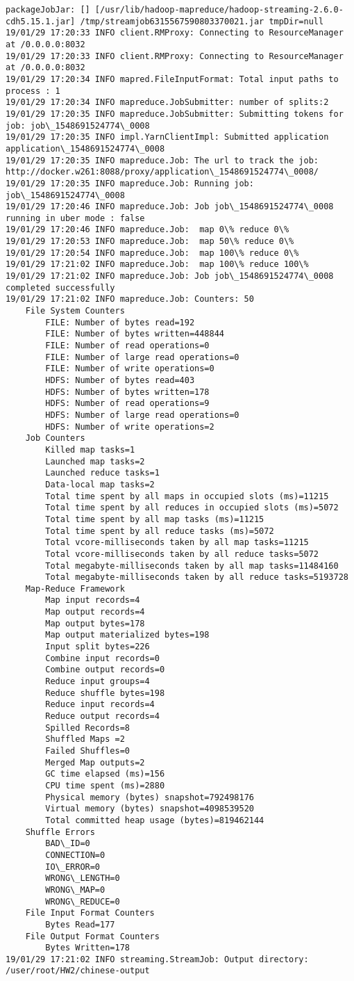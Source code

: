 \documentclass[11pt]{article}
\begin{document}
    \begin{Verbatim}[commandchars=\\\{\}]
packageJobJar: [] [/usr/lib/hadoop-mapreduce/hadoop-streaming-2.6.0-cdh5.15.1.jar] /tmp/streamjob6315567590803370021.jar tmpDir=null
19/01/29 17:20:33 INFO client.RMProxy: Connecting to ResourceManager at /0.0.0.0:8032
19/01/29 17:20:33 INFO client.RMProxy: Connecting to ResourceManager at /0.0.0.0:8032
19/01/29 17:20:34 INFO mapred.FileInputFormat: Total input paths to process : 1
19/01/29 17:20:34 INFO mapreduce.JobSubmitter: number of splits:2
19/01/29 17:20:35 INFO mapreduce.JobSubmitter: Submitting tokens for job: job\_1548691524774\_0008
19/01/29 17:20:35 INFO impl.YarnClientImpl: Submitted application application\_1548691524774\_0008
19/01/29 17:20:35 INFO mapreduce.Job: The url to track the job: http://docker.w261:8088/proxy/application\_1548691524774\_0008/
19/01/29 17:20:35 INFO mapreduce.Job: Running job: job\_1548691524774\_0008
19/01/29 17:20:46 INFO mapreduce.Job: Job job\_1548691524774\_0008 running in uber mode : false
19/01/29 17:20:46 INFO mapreduce.Job:  map 0\% reduce 0\%
19/01/29 17:20:53 INFO mapreduce.Job:  map 50\% reduce 0\%
19/01/29 17:20:54 INFO mapreduce.Job:  map 100\% reduce 0\%
19/01/29 17:21:02 INFO mapreduce.Job:  map 100\% reduce 100\%
19/01/29 17:21:02 INFO mapreduce.Job: Job job\_1548691524774\_0008 completed successfully
19/01/29 17:21:02 INFO mapreduce.Job: Counters: 50
	File System Counters
		FILE: Number of bytes read=192
		FILE: Number of bytes written=448844
		FILE: Number of read operations=0
		FILE: Number of large read operations=0
		FILE: Number of write operations=0
		HDFS: Number of bytes read=403
		HDFS: Number of bytes written=178
		HDFS: Number of read operations=9
		HDFS: Number of large read operations=0
		HDFS: Number of write operations=2
	Job Counters 
		Killed map tasks=1
		Launched map tasks=2
		Launched reduce tasks=1
		Data-local map tasks=2
		Total time spent by all maps in occupied slots (ms)=11215
		Total time spent by all reduces in occupied slots (ms)=5072
		Total time spent by all map tasks (ms)=11215
		Total time spent by all reduce tasks (ms)=5072
		Total vcore-milliseconds taken by all map tasks=11215
		Total vcore-milliseconds taken by all reduce tasks=5072
		Total megabyte-milliseconds taken by all map tasks=11484160
		Total megabyte-milliseconds taken by all reduce tasks=5193728
	Map-Reduce Framework
		Map input records=4
		Map output records=4
		Map output bytes=178
		Map output materialized bytes=198
		Input split bytes=226
		Combine input records=0
		Combine output records=0
		Reduce input groups=4
		Reduce shuffle bytes=198
		Reduce input records=4
		Reduce output records=4
		Spilled Records=8
		Shuffled Maps =2
		Failed Shuffles=0
		Merged Map outputs=2
		GC time elapsed (ms)=156
		CPU time spent (ms)=2880
		Physical memory (bytes) snapshot=792498176
		Virtual memory (bytes) snapshot=4098539520
		Total committed heap usage (bytes)=819462144
	Shuffle Errors
		BAD\_ID=0
		CONNECTION=0
		IO\_ERROR=0
		WRONG\_LENGTH=0
		WRONG\_MAP=0
		WRONG\_REDUCE=0
	File Input Format Counters 
		Bytes Read=177
	File Output Format Counters 
		Bytes Written=178
19/01/29 17:21:02 INFO streaming.StreamJob: Output directory: /user/root/HW2/chinese-output


\end{Verbatim}
\end{document}
